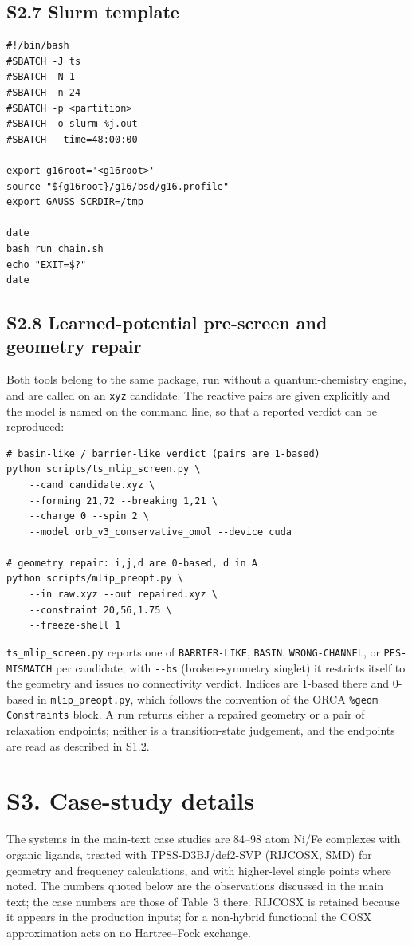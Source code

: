 \documentclass[11pt,a4paper]{article}
\begin{document}
\subsection*{S2.7 Slurm template}
\begin{verbatim}
#!/bin/bash
#SBATCH -J ts
#SBATCH -N 1
#SBATCH -n 24
#SBATCH -p <partition>
#SBATCH -o slurm-%j.out
#SBATCH --time=48:00:00

export g16root='<g16root>'
source "${g16root}/g16/bsd/g16.profile"
export GAUSS_SCRDIR=/tmp

date
bash run_chain.sh
echo "EXIT=$?"
date
\end{verbatim}

\subsection*{S2.8 Learned-potential pre-screen and geometry repair}
Both tools belong to the same package, run without a quantum-chemistry engine,
and are called on an \texttt{xyz} candidate. The reactive pairs are given
explicitly and the model is named on the command line, so that a reported
verdict can be reproduced:
\begin{verbatim}
# basin-like / barrier-like verdict (pairs are 1-based)
python scripts/ts_mlip_screen.py \
    --cand candidate.xyz \
    --forming 21,72 --breaking 1,21 \
    --charge 0 --spin 2 \
    --model orb_v3_conservative_omol --device cuda

# geometry repair: i,j,d are 0-based, d in A
python scripts/mlip_preopt.py \
    --in raw.xyz --out repaired.xyz \
    --constraint 20,56,1.75 \
    --freeze-shell 1
\end{verbatim}
\texttt{ts\_mlip\_screen.py} reports one of \texttt{BARRIER-LIKE},
\texttt{BASIN}, \texttt{WRONG-CHANNEL}, or \texttt{PES-MISMATCH} per candidate;
with \verb|--bs| (broken-symmetry singlet) it restricts itself to the geometry
and issues no connectivity verdict. Indices are 1-based there and 0-based in
\texttt{mlip\_preopt.py}, which follows the convention of the ORCA
\texttt{\%geom Constraints} block. A run returns either a repaired geometry or a
pair of relaxation endpoints; neither is a transition-state judgement, and the
endpoints are read as described in S1.2.

\section*{S3. Case-study details}

The systems in the main-text case studies are 84--98 atom Ni/Fe complexes with
organic ligands, treated with TPSS-D3BJ/def2-SVP (RIJCOSX, SMD) for geometry
and frequency calculations, and with higher-level single points where noted.
The numbers quoted below are the observations discussed in the main text; the
case numbers are those of Table~3 there. RIJCOSX is retained because it appears
in the production inputs; for a non-hybrid functional the COSX approximation
acts on no Hartree--Fock exchange.
\end{document}
